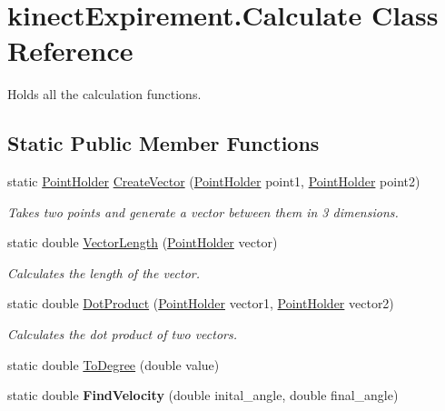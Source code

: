 \hypertarget{classkinect_expirement_1_1_calculate}{}\section{kinect\+Expirement.\+Calculate Class Reference}
\label{classkinect_expirement_1_1_calculate}


Holds all the calculation functions. 


\subsection*{Static Public Member Functions}
\begin{DoxyCompactItemize}
\item 
static \hyperlink{classkinect_expirement_1_1_point_holder}{Point\+Holder} \hyperlink{classkinect_expirement_1_1_calculate_a8fdf801a3bdee7bd1a327cc42e86aed9}{Create\+Vector} (\hyperlink{classkinect_expirement_1_1_point_holder}{Point\+Holder} point1, \hyperlink{classkinect_expirement_1_1_point_holder}{Point\+Holder} point2)
\begin{DoxyCompactList}\small\item\em Takes two points and generate a vector between them in 3 dimensions. \end{DoxyCompactList}\item 
static double \hyperlink{classkinect_expirement_1_1_calculate_a9c9d55d2e89605013fd5280deb572468}{Vector\+Length} (\hyperlink{classkinect_expirement_1_1_point_holder}{Point\+Holder} vector)
\begin{DoxyCompactList}\small\item\em Calculates the length of the vector. \end{DoxyCompactList}\item 
static double \hyperlink{classkinect_expirement_1_1_calculate_a5e407f5e00cb311cea31f7172fa4a5d0}{Dot\+Product} (\hyperlink{classkinect_expirement_1_1_point_holder}{Point\+Holder} vector1, \hyperlink{classkinect_expirement_1_1_point_holder}{Point\+Holder} vector2)
\begin{DoxyCompactList}\small\item\em Calculates the dot product of two vectors. \end{DoxyCompactList}\item 
static double \hyperlink{classkinect_expirement_1_1_calculate_a02fbfb617abfb0e06c8e92cb25f9f9e8}{To\+Degree} (double value)
\item 
static double {\bfseries Find\+Velocity} (double inital\+\_\+angle, double final\+\_\+angle)\hypertarget{classkinect_expirement_1_1_calculate_a91876175c733dc14e51ac1eb5c255142}{}\label{classkinect_expirement_1_1_calculate_a91876175c733dc14e51ac1eb5c255142}

\end{DoxyCompactItemize}


